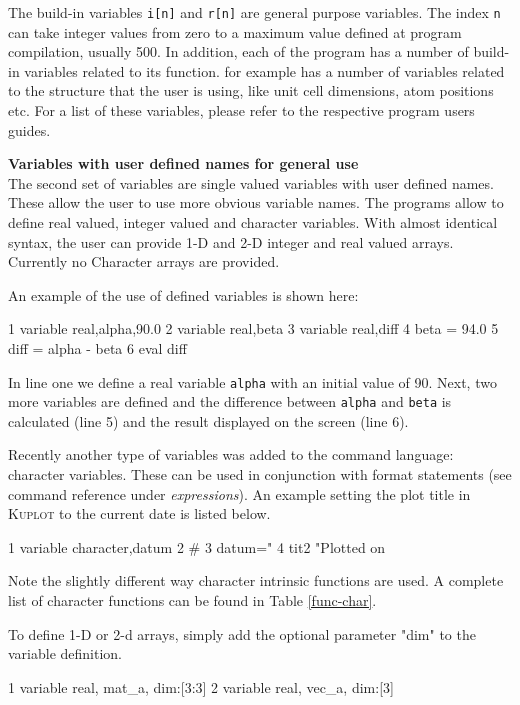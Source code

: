 The build-in variables {\tt i[n]} and {\tt r[n]} are general purpose 
variables. The index {\tt n} can take integer values from zero to a 
maximum value defined at program compilation, usually 500. In addition,
 each of the program has a number of build-in
variables related to its function. \Discus for example has a number of 
variables related to the structure that the user is using, like unit cell 
dimensions, atom positions etc. For a list of these variables,
please refer to the respective program users guides.
\par
\par

{\bf Variables with user defined names for general use}\\
The second set of variables are single valued variables with user
defined names. These allow the user to use more obvious variable 
names. The programs allow to define real valued, integer valued
and character variables.
With almost identical syntax, the user can provide 1-D and 2-D
integer and real valued arrays. Currently no Character arrays are provided.

An example of the use of defined variables is shown here:
%
\begin{MacVerbatim}
   1  variable real,alpha,90.0
   2  variable real,beta
   3  variable real,diff
   4  beta = 94.0
   5  diff = alpha - beta
   6  eval diff
\end{MacVerbatim}
%
In line one we define a real variable {\tt alpha} with an initial
value of 90. Next, two more variables are defined and the difference
between {\tt alpha} and {\tt beta} is calculated (line 5) and the
result displayed on the screen (line 6). 

Recently another type of variables was added to the command language:
character variables. These can be used in conjunction with format 
statements (see command reference under \textit{expressions}). An example 
setting the plot title in \textsc{Kuplot} to the current date is listed
below.
%
\begin{MacVerbatim}
   1  variable character,datum
   2  #
   3  datum="%
   4  tit2 "Plotted on %
\end{MacVerbatim}
%
Note the slightly different way character intrinsic functions are used.
A complete list of character functions can be found in Table
\ref{func-char}.

To define 1-D or 2-d arrays, simply add the optional parameter "dim"
to the variable definition.
\begin{MacVerbatim}
   1  variable real, mat_a, dim:[3:3]
   2  variable real, vec_a, dim:[3]
\end{MacVerbatim}

